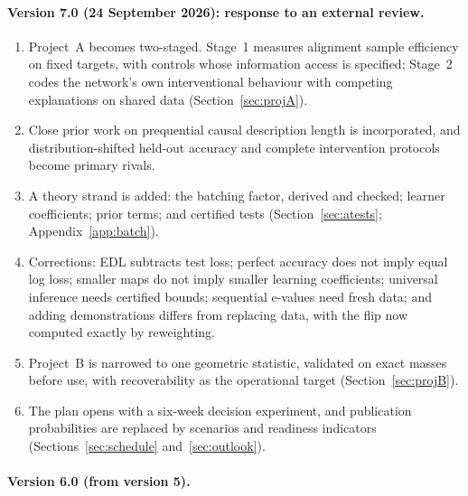 \documentclass[11pt,a4paper]{article}
\begin{document}
\paragraph{Version 7.0 (24 September 2026): response to an external review.}
\begin{enumerate}[leftmargin=*]
\item Project~A becomes two-staged. Stage~1 measures alignment sample
efficiency on fixed targets, with controls whose information access is
specified; Stage~2 codes the network's own interventional behaviour with
competing explanations on shared data (Section~\ref{sec:projA}).
\item Close prior work on prequential causal description length is
incorporated, and distribution-shifted held-out accuracy and complete
intervention protocols become primary rivals.
\item A theory strand is added: the batching factor, derived and checked;
learner coefficients; prior terms; and certified tests
(Section~\ref{sec:atests}; Appendix~\ref{app:batch}).
\item Corrections: EDL subtracts test loss; perfect accuracy does not imply
equal log loss; smaller maps do not imply smaller learning coefficients;
universal inference needs certified bounds; sequential e-values need fresh
data; and adding demonstrations differs from replacing data, with the flip
now computed exactly by reweighting.
\item Project~B is narrowed to one geometric statistic, validated on exact
masses before use, with recoverability as the operational target
(Section~\ref{sec:projB}).
\item The plan opens with a six-week decision experiment, and publication
probabilities are replaced by scenarios and readiness indicators
(Sections~\ref{sec:schedule} and~\ref{sec:outlook}).
\end{enumerate}

\paragraph{Version 6.0 (from version 5).}
\end{document}
